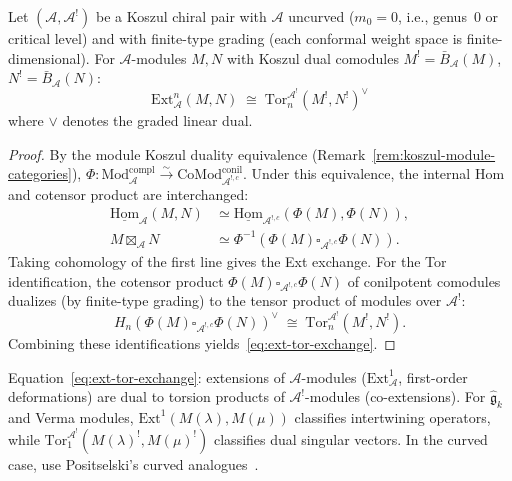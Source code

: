 \begin{proposition}
\label{prop:ext-tor-exchange}
Let $(\mathcal{A}, \mathcal{A}^!)$ be a Koszul chiral pair with
$\mathcal{A}$ uncurved ($m_0 = 0$, i.e., genus~$0$ or critical
level) and with finite-type grading (each conformal weight space
is finite-dimensional).  For $\mathcal{A}$-modules $M, N$ with Koszul dual
comodules $M^! = \bar{B}_{\mathcal{A}}(M)$,
$N^! = \bar{B}_{\mathcal{A}}(N)$:
\begin{equation}\label{eq:ext-tor-exchange}
\mathrm{Ext}^n_{\mathcal{A}}(M, N)
\;\cong\;
\mathrm{Tor}_n^{\mathcal{A}^!}(M^!, N^!)^{\vee}
\end{equation}
where $\vee$ denotes the graded linear dual.
\end{proposition}

\begin{proof}
By the module Koszul duality equivalence
(Remark~\ref{rem:koszul-module-categories}),
$\Phi: \mathrm{Mod}^{\mathrm{compl}}_{\mathcal{A}}
\xrightarrow{\sim}
\mathrm{CoMod}^{\mathrm{conil}}_{\mathcal{A}^{!,c}}$.
Under this equivalence, the internal Hom and cotensor product
are interchanged:
\begin{align*}
\underline{\mathrm{Hom}}_{\mathcal{A}}(M, N) &\simeq
\underline{\mathrm{Hom}}_{\mathcal{A}^{!,c}}
(\Phi(M), \Phi(N)), \\
M \boxtimes_{\mathcal{A}} N &\simeq
\Phi^{-1}(\Phi(M) \square_{\mathcal{A}^{!,c}} \Phi(N)).
\end{align*}
Taking cohomology of the first line gives the Ext exchange.
For the Tor identification, the cotensor product
$\Phi(M) \square_{\mathcal{A}^{!,c}} \Phi(N)$
of conilpotent comodules dualizes (by finite-type grading)
to the tensor product of modules over $\mathcal{A}^!$:
\[
H_n(\Phi(M) \square_{\mathcal{A}^{!,c}} \Phi(N))^{\vee}
\;\cong\;
\mathrm{Tor}_n^{\mathcal{A}^!}(M^!, N^!).
\]
Combining these identifications
yields~\eqref{eq:ext-tor-exchange}.
\end{proof}

\begin{remark}\label{rem:ext-tor-interpretation}
Equation~\eqref{eq:ext-tor-exchange}: extensions of $\mathcal{A}$-modules ($\mathrm{Ext}^1_{\mathcal{A}}$, first-order deformations) are dual to torsion products of $\mathcal{A}^!$-modules (co-extensions).  For $\widehat{\mathfrak{g}}_k$ and Verma modules, $\mathrm{Ext}^1(M(\lambda), M(\mu))$ classifies intertwining operators, while $\mathrm{Tor}_1^{\mathcal{A}^!}(M(\lambda)^!, M(\mu)^!)$ classifies dual singular vectors.  In the curved case, use Positselski's curved analogues~\cite{Positselski11}.
\end{remark}

